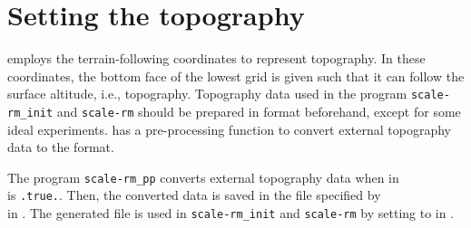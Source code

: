 \section{Setting the topography} \label{subsec:basic_usel_topo}

\scalerm employs the terrain-following coordinates to represent topography.
In these coordinates, the bottom face of the lowest grid is given such that it can follow the surface altitude, i.e., topography.
Topography data used in the program \verb|scale-rm_init| and \verb|scale-rm| should be prepared in \scalelib format beforehand, except for some ideal experiments.
\scalerm has a pre-processing function to convert external topography data to the format.


The program \verb|scale-rm_pp| converts external topography data when  in \\  is \verb|.true.|.
Then, the converted data is saved in the file specified by \\  in .
The generated file is used in \verb|scale-rm_init| and \verb|scale-rm| by setting to  in .


